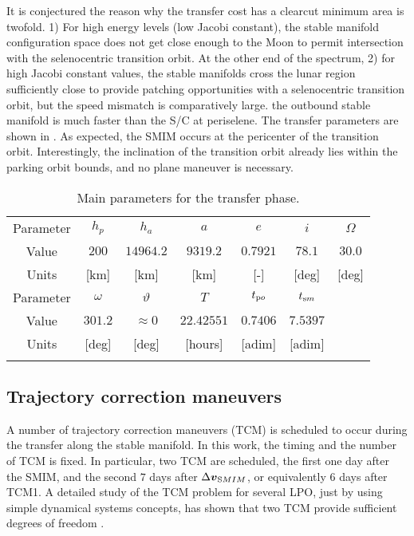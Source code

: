 It is conjectured the reason why the transfer cost has a clearcut minimum area is twofold. 1) For high energy levels (\ie low Jacobi constant), the stable manifold configuration space does not get close enough to the Moon to permit intersection with the selenocentric transition orbit. At the other end of the spectrum, 2) for high Jacobi constant values, the stable manifolds cross the lunar region sufficiently close to provide patching opportunities with a selenocentric transition orbit, but the speed mismatch is comparatively large. \Ie the outbound stable manifold is much faster than the S/C at periselene. The transfer parameters are shown in . As expected, the {SMIM} occurs at the pericenter of the transition orbit. Interestingly, the inclination of the transition orbit already lies within the parking orbit bounds, and no plane maneuver is necessary.
%
\begin{table}[h!]
	\caption{Main parameters for the transfer phase.}
	\label{tab:TranferParameters}
	\centering
	\scriptsize
	\begin{tabular}{ccccccc}
		\TOPlines
		Parameter & $h_p$ & $h_a$ & $a$ & $e$ & $i$ & $\Omega$ \\
		Value & $200$ & $14964.2$ & $9319.2$ & $0.7921$ & $78.1$ & $30.0$ \\ 
		Units & [km] & [km] & [km] & [-] & [deg] & [deg] \\
		\MIDline
		Parameter & $\omega$ & $\vartheta$ & $T$ & $t_{\textrm po}$ & $t_{\textrm sm}$ & \\
		Value & $301.2$ & $\approx0$ & $22.42551$ & $0.7406$ & $7.5397$ & \\
		Units & [deg] & [deg] & [hours] & [adim] & [adim] & \\
		\BOTTOMlines
	\end{tabular}
\end{table}
%

\subsection{Trajectory correction maneuvers}\label{subsec:Monte Carlo analysis for TCMs scheduling}
A number of trajectory correction maneuvers (TCM) is scheduled to occur during the transfer along the stable manifold. In this work, the timing and the number of {TCM} is fixed. In particular, two {TCM} are scheduled, the first one day after the {SMIM}, and the second $7$ days after $\Delta\boldsymbol{v}_{\textrm SMIM}$, or equivalently $6$ days after TCM1. A detailed study of the TCM problem for several {LPO}, just by using simple dynamical systems concepts, has shown that two {TCM} provide sufficient degrees of freedom \cite{gomez2005TCM}.


